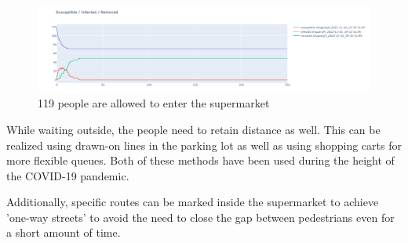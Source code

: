 \begin{figure}[H]
    \centering
    \includegraphics[width=\linewidth]{images/task5_shopping5.png}
    \caption{119 people are allowed to enter the supermarket}
    \label{fig:graph119}
\end{figure}



While waiting outside, the people need to retain distance as well. This can be realized using drawn-on lines in the parking lot as well as using shopping carts for more flexible queues. Both of these methods have been used during the height of the COVID-19 pandemic. \cite{covid-queue-bbc, covoid-queue-wired}


Additionally, specific routes can be marked inside the supermarket to achieve 'one-way streets' to avoid the need to close the gap between pedestrians even for a short amount of time. 


